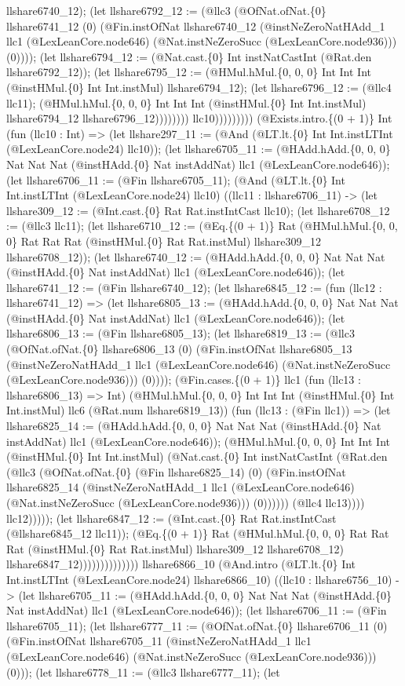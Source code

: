 \documentclass[11pt]{article}
\begin{document}
llshare6740\_12); (let llshare6792\_12 := (@llc3 (@OfNat.ofNat.\{0\} llshare6741\_12 (0) (@Fin.instOfNat llshare6740\_12 (@instNeZeroNatHAdd\_1 llc1 (@LexLeanCore.node646) (@Nat.instNeZeroSucc (@LexLeanCore.node936))) (0)))); (let llshare6794\_12 := (@Nat.cast.\{0\} Int instNatCastInt (@Rat.den llshare6792\_12)); (let llshare6795\_12 := (@HMul.hMul.\{0, 0, 0\} Int Int Int (@instHMul.\{0\} Int Int.instMul) llshare6794\_12); (let llshare6796\_12 := (@llc4 llc11); (@HMul.hMul.\{0, 0, 0\} Int Int Int (@instHMul.\{0\} Int Int.instMul) llshare6794\_12 llshare6796\_12)))))))) llc10))))))))) (@Exists.intro.\{(0 + 1)\} Int (fun (llc10 : Int) => (let llshare297\_11 := (@And (@LT.lt.\{0\} Int Int.instLTInt (@LexLeanCore.node24) llc10)); (let llshare6705\_11 := (@HAdd.hAdd.\{0, 0, 0\} Nat Nat Nat (@instHAdd.\{0\} Nat instAddNat) llc1 (@LexLeanCore.node646)); (let llshare6706\_11 := (@Fin llshare6705\_11); (@And (@LT.lt.\{0\} Int Int.instLTInt (@LexLeanCore.node24) llc10) ((llc11 : llshare6706\_11) -> (let llshare309\_12 := (@Int.cast.\{0\} Rat Rat.instIntCast llc10); (let llshare6708\_12 := (@llc3 llc11); (let llshare6710\_12 := (@Eq.\{(0 + 1)\} Rat (@HMul.hMul.\{0, 0, 0\} Rat Rat Rat (@instHMul.\{0\} Rat Rat.instMul) llshare309\_12 llshare6708\_12)); (let llshare6740\_12 := (@HAdd.hAdd.\{0, 0, 0\} Nat Nat Nat (@instHAdd.\{0\} Nat instAddNat) llc1 (@LexLeanCore.node646)); (let llshare6741\_12 := (@Fin llshare6740\_12); (let llshare6845\_12 := (fun (llc12 : llshare6741\_12) => (let llshare6805\_13 := (@HAdd.hAdd.\{0, 0, 0\} Nat Nat Nat (@instHAdd.\{0\} Nat instAddNat) llc1 (@LexLeanCore.node646)); (let llshare6806\_13 := (@Fin llshare6805\_13); (let llshare6819\_13 := (@llc3 (@OfNat.ofNat.\{0\} llshare6806\_13 (0) (@Fin.instOfNat llshare6805\_13 (@instNeZeroNatHAdd\_1 llc1 (@LexLeanCore.node646) (@Nat.instNeZeroSucc (@LexLeanCore.node936))) (0)))); (@Fin.cases.\{(0 + 1)\} llc1 (fun (llc13 : llshare6806\_13) => Int) (@HMul.hMul.\{0, 0, 0\} Int Int Int (@instHMul.\{0\} Int Int.instMul) llc6 (@Rat.num llshare6819\_13)) (fun (llc13 : (@Fin llc1)) => (let llshare6825\_14 := (@HAdd.hAdd.\{0, 0, 0\} Nat Nat Nat (@instHAdd.\{0\} Nat instAddNat) llc1 (@LexLeanCore.node646)); (@HMul.hMul.\{0, 0, 0\} Int Int Int (@instHMul.\{0\} Int Int.instMul) (@Nat.cast.\{0\} Int instNatCastInt (@Rat.den (@llc3 (@OfNat.ofNat.\{0\} (@Fin llshare6825\_14) (0) (@Fin.instOfNat llshare6825\_14 (@instNeZeroNatHAdd\_1 llc1 (@LexLeanCore.node646) (@Nat.instNeZeroSucc (@LexLeanCore.node936))) (0)))))) (@llc4 llc13)))) llc12))))); (let llshare6847\_12 := (@Int.cast.\{0\} Rat Rat.instIntCast (@llshare6845\_12 llc11)); (@Eq.\{(0 + 1)\} Rat (@HMul.hMul.\{0, 0, 0\} Rat Rat Rat (@instHMul.\{0\} Rat Rat.instMul) llshare309\_12 llshare6708\_12) llshare6847\_12)))))))))))))) llshare6866\_10 (@And.intro (@LT.lt.\{0\} Int Int.instLTInt (@LexLeanCore.node24) llshare6866\_10) ((llc10 : llshare6756\_10) -> (let llshare6705\_11 := (@HAdd.hAdd.\{0, 0, 0\} Nat Nat Nat (@instHAdd.\{0\} Nat instAddNat) llc1 (@LexLeanCore.node646)); (let llshare6706\_11 := (@Fin llshare6705\_11); (let llshare6777\_11 := (@OfNat.ofNat.\{0\} llshare6706\_11 (0) (@Fin.instOfNat llshare6705\_11 (@instNeZeroNatHAdd\_1 llc1 (@LexLeanCore.node646) (@Nat.instNeZeroSucc (@LexLeanCore.node936))) (0))); (let llshare6778\_11 := (@llc3 llshare6777\_11); (let 
\end{document}
